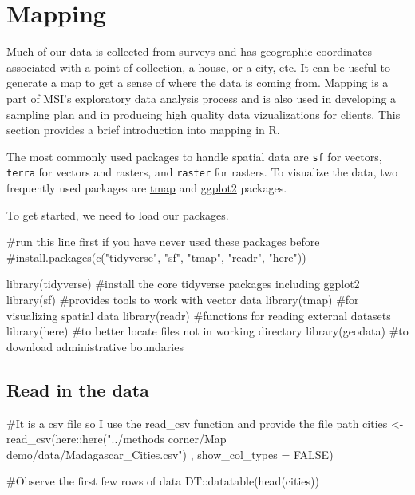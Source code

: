 \documentclass[
  letterpaper,
  DIV=11,
  numbers=noendperiod]{scrreprt}
\newenvironment{Shaded}{\begin{snugshade}}{\end{snugshade}}
\newcommand{\AttributeTok}[1]{\textcolor[rgb]{0.40,0.45,0.13}{#1}}
\newcommand{\CommentTok}[1]{\textcolor[rgb]{0.37,0.37,0.37}{#1}}
\newcommand{\ConstantTok}[1]{\textcolor[rgb]{0.56,0.35,0.01}{#1}}
\newcommand{\FunctionTok}[1]{\textcolor[rgb]{0.28,0.35,0.67}{#1}}
\newcommand{\NormalTok}[1]{\textcolor[rgb]{0.00,0.23,0.31}{#1}}
\newcommand{\OtherTok}[1]{\textcolor[rgb]{0.00,0.23,0.31}{#1}}
\newcommand{\SpecialCharTok}[1]{\textcolor[rgb]{0.37,0.37,0.37}{#1}}
\newcommand{\StringTok}[1]{\textcolor[rgb]{0.13,0.47,0.30}{#1}}
\begin{document}
\chapter{Mapping}\label{mapping}

Much of our data is collected from surveys and has geographic
coordinates associated with a point of collection, a house, or a city,
etc. It can be useful to generate a map to get a sense of where the data
is coming from. Mapping is a part of MSI's exploratory data analysis
process and is also used in developing a sampling plan and in producing
high quality data vizualizations for clients. This section provides a
brief introduction into mapping in R.

The most commonly used packages to handle spatial data are \texttt{sf}
for vectors, \texttt{terra} for vectors and rasters, and \texttt{raster}
for rasters. To visualize the data, two frequently used packages are
\href{https://r-tmap.github.io/tmap/}{tmap} and
\href{https://ggplot2.tidyverse.org/}{ggplot2} packages.

To get started, we need to load our packages.

\begin{Shaded}
\begin{Highlighting}[]
\CommentTok{\#run this line first if you have never used these packages before}
\CommentTok{\#install.packages(c("tidyverse", "sf", "tmap", "readr", "here"))}

\FunctionTok{library}\NormalTok{(tidyverse) }\CommentTok{\#install the core tidyverse packages including ggplot2}
\FunctionTok{library}\NormalTok{(sf) }\CommentTok{\#provides tools to work with vector data }
\FunctionTok{library}\NormalTok{(tmap) }\CommentTok{\#for visualizing spatial data}
\FunctionTok{library}\NormalTok{(readr) }\CommentTok{\#functions for reading external datasets }
\FunctionTok{library}\NormalTok{(here) }\CommentTok{\#to better locate files not in working directory}
\FunctionTok{library}\NormalTok{(geodata) }\CommentTok{\#to download administrative boundaries}
\end{Highlighting}
\end{Shaded}

\section{Read in the data}\label{read-in-the-data}

\begin{Shaded}
\begin{Highlighting}[]
\CommentTok{\#It is a csv file so I use the read\_csv function and provide the file path}
\NormalTok{cities }\OtherTok{\textless{}{-}} \FunctionTok{read\_csv}\NormalTok{(here}\SpecialCharTok{::}\FunctionTok{here}\NormalTok{(}\StringTok{"../methods corner/Map demo/data/Madagascar\_Cities.csv"}\NormalTok{)}
\NormalTok{                   , }\AttributeTok{show\_col\_types =} \ConstantTok{FALSE}\NormalTok{)}

\CommentTok{\#Observe the first few rows of data}
\NormalTok{DT}\SpecialCharTok{::}\FunctionTok{datatable}\NormalTok{(}\FunctionTok{head}\NormalTok{(cities))}
\end{Highlighting}
\end{Shaded}
\end{document}
